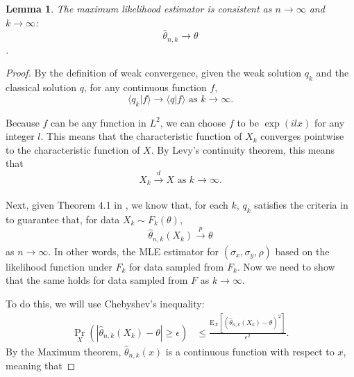 \documentclass[10pt]{article}
\newtheorem{lemma}{Lemma}
\begin{document}


\begin{lemma}
  The maximum likelihood estimator is consistent as $n \to \infty$ and $k \to \infty$:
  \[ \hat{\theta}_{n,k} \to \theta \].
\end{lemma}
\begin{proof}
  By the definition of weak convergence, given the weak solution $q_k$
  and the classical solution $q$, for any continuous function $f$,
  \[ \langle q_k| f \rangle \to \langle q| f \rangle \mbox { as } k \to \infty. \]

  Because $f$ can be any function in $L^2$, we can choose $f$ to be
  $\exp(ilx)$ for any integer $l$. This means that the characteristic
  function of $X_k$ converges pointwise to the characteristic function
  of $X$. By Levy's continuity theorem, this means that
  \[ X_k \xrightarrow[]{d} X \mbox { as } k \to \infty. \]

  Next, given Theorem 4.1 in \cite{singler2008differentiability}, we
  know that, for each $k$, $q_k$ satisfies the criteria in
  \cite{casella2002statistical} to guarantee that, for data
  $X_{k} \sim F_k(\theta)$,
  \[ \hat{\theta}_{n,k}(X_k) \xrightarrow[]{p} \theta \] as $n \to
  \infty$. In other words, the MLE estimator for
  $(\sigma_x, \sigma_y, \rho)$ based on the likelihood function under
  $F_k$ for data sampled from $F_k$. Now we need to show that the same
  holds for data sampled from $F$ as $k \to \infty$.

  To do this, we will use Chebyshev's inequality:
  \begin{align*}
    \Pr_{X}\left( \left| \hat{\theta}_{n,k}(X_k) - \theta \right| \geq \epsilon \right) &\leq \frac{ \mbox{E}_{X}\left[ (\hat{\theta}_{n,k}(X_k) - \theta)^2 \right] }{ \epsilon^2 }.
  \end{align*}
  By the Maximum theorem, $\hat{\theta}_{n,k}(x)$ is a continuous
  function with respect to $x$, meaning that 
\end{proof}




\end{document}

